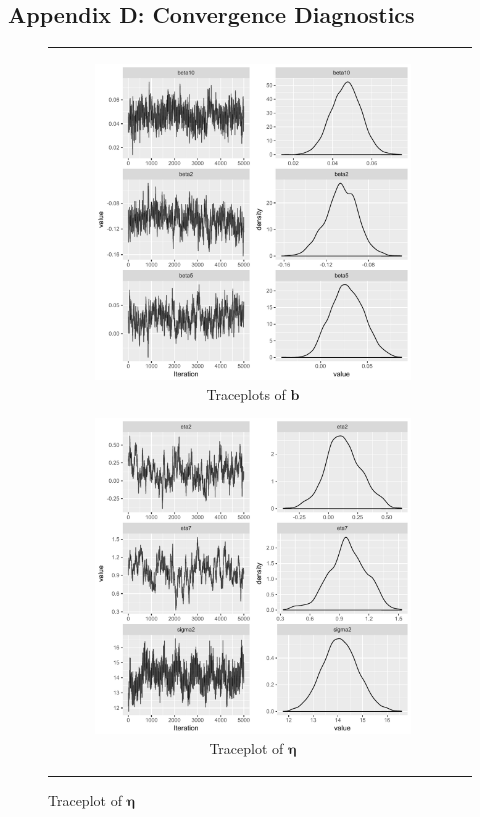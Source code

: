 \documentclass[ba]{imsart}
\numberwithin{equation}{section}
\theoremstyle{plain}
\begin{document}
	\subsection*{Appendix D: Convergence Diagnostics}\label{appendix: convergence}
		\begin{figure}[H]
			\centering
			\begin{tabular}[t]{cc}
				\begin{subfigure}[b]{0.495\textwidth}
					\caption{Traceplots of $\boldsymbol{b}$}
					\includegraphics[width=\textwidth]{img/betatrace.pdf}	
				\end{subfigure}
				\begin{subfigure}[b]{0.495\textwidth}
					\caption{Traceplot of $\boldsymbol{\eta}$}
					\includegraphics[width=\textwidth]{img/etatrace.pdf}	

\end{subfigure}
\end{tabular}
\end{figure}
\end{document}
